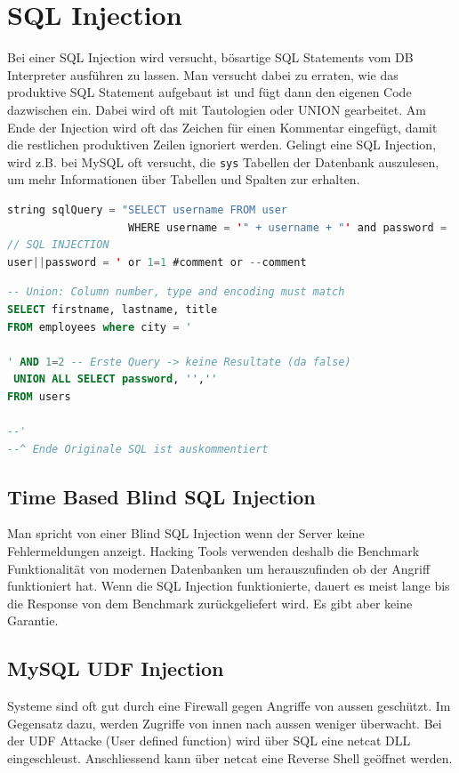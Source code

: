 \section{SQL Injection}
Bei einer SQL Injection wird versucht, bösartige SQL Statements vom DB Interpreter ausführen zu lassen. Man versucht dabei zu erraten, wie das produktive SQL Statement aufgebaut ist und fügt dann den eigenen Code dazwischen ein. Dabei wird oft mit Tautologien oder UNION gearbeitet. Am Ende der Injection wird oft das Zeichen für einen Kommentar eingefügt, damit die restlichen produktiven Zeilen ignoriert werden. Gelingt eine SQL Injection, wird z.B. bei MySQL oft versucht, die \lstinline|sys| Tabellen der Datenbank auszulesen, um mehr Informationen über Tabellen und Spalten zur erhalten.
\begin{lstlisting}[language=Java]
string sqlQuery = "SELECT username FROM user 
				   WHERE username = '" + username + "' and password = '" + password + "'";
// SQL INJECTION
user||password = ' or 1=1 #comment or --comment
\end{lstlisting}

\begin{lstlisting}[language=SQL]
-- Union: Column number, type and encoding must match
SELECT firstname, lastname, title
FROM employees where city = ' 

' AND 1=2 -- Erste Query -> keine Resultate (da false)
 UNION ALL SELECT password, '',''
FROM users

--'
--^ Ende Originale SQL ist auskommentiert
\end{lstlisting}

\subsection{Time Based Blind SQL Injection}
Man spricht von einer Blind SQL Injection wenn der Server keine Fehlermeldungen anzeigt. Hacking Tools verwenden deshalb die Benchmark Funktionalität von modernen Datenbanken um herauszufinden ob der Angriff funktioniert hat. Wenn die SQL Injection funktionierte, dauert es meist lange bis die Response von dem Benchmark zurückgeliefert wird. Es gibt aber keine Garantie.

\subsection{MySQL UDF Injection}
Systeme sind oft gut durch eine Firewall gegen Angriffe von aussen geschützt. Im Gegensatz dazu, werden Zugriffe von innen nach aussen weniger überwacht. Bei der UDF Attacke (User defined function) wird über SQL eine netcat DLL eingeschleust. Anschliessend kann über netcat eine Reverse Shell geöffnet werden.

